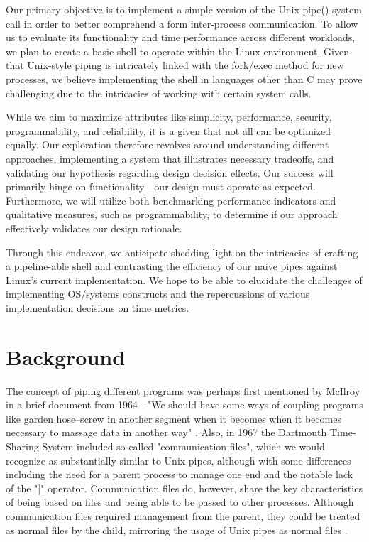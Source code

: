 Our primary objective is to implement a simple version of the Unix pipe() system call in order to better comprehend a form inter-process communication. To allow us to evaluate its functionality and time performance across different workloads, we plan to create a basic shell to operate within the Linux environment. Given that Unix-style piping is intricately linked with the fork/exec method for new processes, we believe implementing the shell in languages other than C may prove challenging due to the intricacies of working with certain system calls. 

While we aim to maximize attributes like simplicity, performance, security, programmability, and reliability, it is a given that not all can be optimized equally. Our exploration therefore revolves around understanding different approaches, implementing a system that illustrates necessary tradeoffs, and validating our hypothesis regarding design decision effects. Our success will primarily hinge on functionality—our design must operate as expected. Furthermore, we will utilize both benchmarking performance indicators and qualitative measures, such as programmability, to determine if our approach effectively validates our design rationale. 

Through this endeavor, we anticipate shedding light on the intricacies of crafting a pipeline-able shell and contrasting the efficiency of our naive pipes against Linux's current implementation.  We hope to be able to elucidate the challenges of implementing OS/systems constructs and the repercussions of various implementation decisions on time metrics.

\section{Background}

The concept of piping different programs was perhaps first mentioned by McIlroy in a brief document from 1964 - "We should have some ways of coupling programs like garden hose--screw in another segment when it becomes when it becomes necessary to massage data in another way" \cite{mcilroy}.  Also, in 1967 the Dartmouth Time-Sharing System included so-called "communication files", which we would recognize as substantially similar to Unix pipes, although with some differences including the need for a parent process to manage one end and the notable lack of the "|" operator. Communication files do, however, share the key characteristics of being based on files and being able to be passed to other processes. Although communication files required management from the parent, they could be treated as normal files by the child, mirroring the usage of Unix pipes as normal files \cite{mcilroydartmouth}. 

